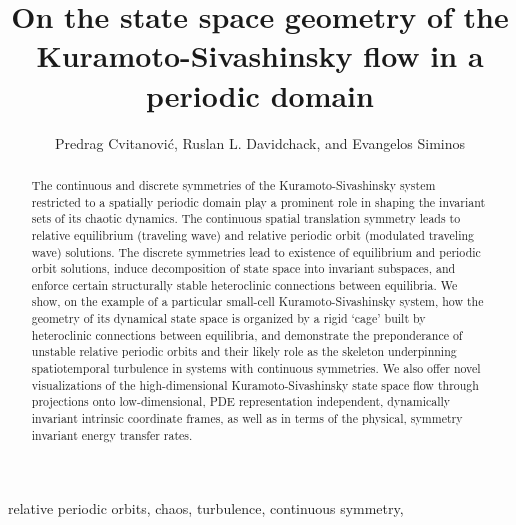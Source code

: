 \documentclass{siamltex}          %
\begin{document}
                \title{
On the state space geometry of the
Kuramoto-Sivashinsky flow in a periodic domain
                 }
                  \author{
Predrag Cvitanovi\'c\footnotemark[1],
Ruslan L. Davidchack\footnotemark[2],
    and
Evangelos Siminos\footnotemark[1]
                    }

                \maketitle

\renewcommand{\thefootnote}{\fnsymbol{footnote}}
\renewcommand{\thefootnote}{\arabic{footnote}}

                \begin{abstract}
The continuous and discrete symmetries of the
Kuramoto-Sivashinsky system restricted to a spatially
periodic domain play a prominent role in shaping the
invariant sets of its chaotic dynamics. The continuous
spatial translation symmetry leads to relative
equilibrium (traveling wave) and relative periodic
orbit (modulated traveling wave) solutions. The
discrete symmetries lead to existence of {equilibrium} and
periodic orbit solutions, induce decomposition of state space
into invariant subspaces, and enforce certain structurally
stable heteroclinic connections between equilibria. We show,
on the example of a particular small-cell Kuramoto-Sivashinsky
system, how the geometry of its dynamical state space is
organized by a rigid `cage' built by heteroclinic connections
between equilibria, and demonstrate the preponderance of
unstable relative periodic orbits and their likely role as
the skeleton underpinning spatiotemporal turbulence in
systems with continuous symmetries. We also offer novel
visualizations of the high-dimensional Kuramoto-Sivashinsky
state space flow through projections onto low-dimensional,
PDE representation independent, dynamically invariant
intrinsic coordinate frames, as well as in terms of the
physical, symmetry invariant energy transfer rates.
                \end{abstract}

\begin{keywords}
relative periodic orbits, chaos, turbulence, continuous symmetry, {\KSe}
\end{keywords}
\end{document}
